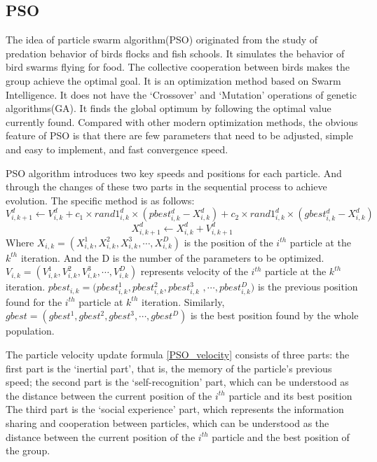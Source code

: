 \documentclass[letterpaper,12pt]{article}
\begin{document}
\subsection{PSO}
\par The idea of particle swarm algorithm(PSO) originated from the study of predation behavior of birds flocks and fish schools\cite{PSO_1}\cite{PSO_2}. It simulates the behavior of bird swarms flying for food. The collective cooperation between birds makes the group achieve the optimal goal. It is an optimization method based on Swarm Intelligence. It does not have the `Crossover' and `Mutation' operations of genetic algorithms(GA). It finds the global optimum by following the optimal value currently found. Compared with other modern optimization methods, the obvious feature of PSO is that there are few parameters that need to be adjusted, simple and easy to implement, and fast convergence speed. 
\par PSO algorithm introduces two key speeds and positions for each particle. And through the changes of these two parts in the sequential process to achieve evolution. The specific method is as follows:
\begin{equation}
V_{i,k+1}^d \leftarrow V_{i, k}^d + c_1\times rand1_{i, k}^d \times (pbest_{i, k}^d - X_{i, k}^d) + c_2\times rand1_{i, k}^d \times (gbest_{i, k}^d - X_{i, k}^d)
\label{PSO_velocity}
\end{equation}
\begin{equation}
X_{i, k+1}^d \leftarrow X_{i, k}^d + V_{i,k+1}^d
\label{PSO_position}
\end{equation}
Where $X_{i, k} = (X_{i,k}^1, X_{i,k}^2, X_{i,k}^3 ,\cdots, X_{i,k}^D)$ is the position of the $i^{th}$ particle at the $k^{th}$ iteration. And the D is the number of the parameters to be optimized.$V_{i, k} = (V_{i,k}^1, V_{i,k}^2, V_{i,k}^3 ,\cdots, V_{i,k}^D)$ represents velocity of the $i^{th}$ particle at the $k^{th}$ iteration. $pbest_{i,k} = (pbest_{i,k}^1, pbest_{i,k}^2, pbest_{i,k}^3 $ $,\cdots, pbest_{i,k}^D)$ is the previous position found for the $i^{th}$ particle at $k^{th}$ iteration. Similarly, $gbest = (gbest^1, gbest^2, gbest^3, \cdots, gbest^D)$ is the best position found by the whole population.

\par The particle velocity update formula \ref{PSO_velocity} consists of three parts: the first part is the `inertial part', that is, the memory of the particle's previous speed; the second part is the `self-recognition' part, which can be understood as the distance between the current position of the $i^{th}$ particle and its best position The third part is the `social experience' part, which represents the information sharing and cooperation between particles, which can be understood as the distance between the current position of the $i^{th}$ particle and the best position of the group.
\end{document}
